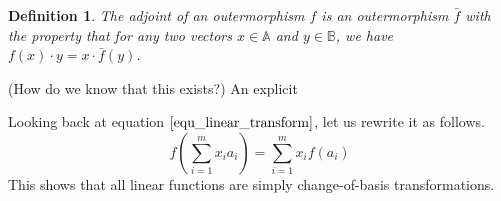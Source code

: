 \documentclass[12pt]{article}
\newcommand{\A}{\mathbb{A}}
\newcommand{\B}{\mathbb{B}}
\newtheorem{definition}{Definition}[section]
\begin{document}
\begin{definition}
The adjoint of an outermorphism $f$ is an outermorphism $\bar{f}$ with the property that
for any two vectors $x\in\A$ and $y\in\B$, we have $f(x)\cdot y= x\cdot \bar{f}(y)$.
\end{definition}
(How do we know that this exists?)  An explicit 


Looking back at equation $\eqref{equ_linear_transform}$, let us rewrite it as follows.
\begin{equation*}
f\left(\sum_{i=1}^m x_i a_i\right) = \sum_{i=1}^m x_i f(a_i)
\end{equation*}
This shows that all linear functions are simply change-of-basis transformations.
\end{document}
